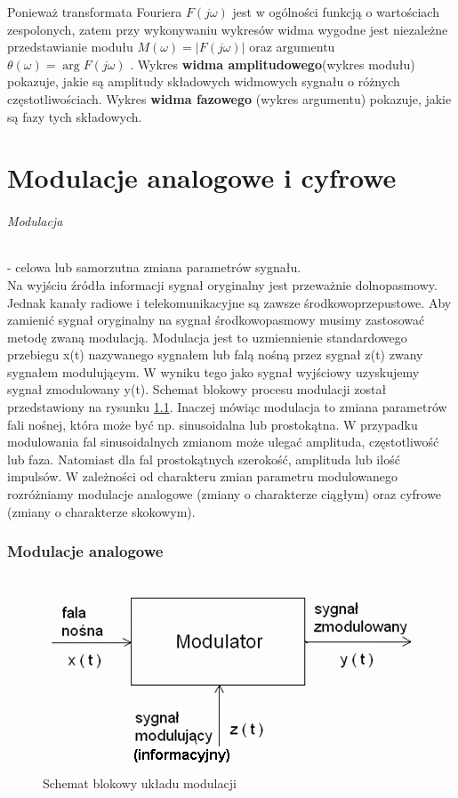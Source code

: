 \documentclass[a4paper,twoside]{report}
\begin{document}
Ponieważ transformata Fouriera  $ F(j \omega) $ jest w ogólności funkcją o wartościach zespolonych, zatem przy wykonywaniu wykresów widma wygodne jest niezależne przedstawianie modułu  $ M(\omega) = | F(j \omega) | $ oraz argumentu $ \theta(\omega) = \arg{F(j \omega)} $ . Wykres \textbf{widma amplitudowego}(wykres modułu) pokazuje, jakie są amplitudy składowych widmowych sygnału o różnych częstotliwościach. Wykres\textbf{ widma fazowego} (wykres argumentu) pokazuje, jakie są fazy tych składowych.

\chapter{Modulacje analogowe i cyfrowe}
\subparagraph{Modulacja} - celowa lub samorzutna zmiana parametrów sygnału. \\

Na wyjściu źródła informacji sygnał oryginalny jest przeważnie dolnopasmowy. Jednak kanały radiowe i telekomunikacyjne są zawsze środkowoprzepustowe. Aby zamienić sygnał oryginalny na sygnał środkowopasmowy musimy zastosować metodę zwaną modulacją. Modulacja jest to uzmiennienie standardowego przebiegu x(t) nazywanego sygnałem lub falą nośną przez sygnał z(t) zwany sygnałem modulującym. W wyniku tego jako sygnał wyjściowy uzyskujemy sygnał zmodulowany y(t). Schemat blokowy procesu modulacji został przedstawiony na rysunku \ref{rys:modulacja_blok}. Inaczej mówiąc modulacja to zmiana parametrów fali nośnej, która może być np. sinusoidalna lub prostokątna. W przypadku modulowania fal sinusoidalnych zmianom może ulegać amplituda, częstotliwość lub faza. Natomiast dla fal prostokątnych szerokość, amplituda lub ilość impulsów. W zależności od charakteru zmian parametru modulowanego rozróżniamy modulacje analogowe (zmiany o charakterze ciągłym) oraz cyfrowe (zmiany o charakterze skokowym).
\subsection{Modulacje analogowe}

\begin{figure}[htbp]
\centering
\includegraphics[scale=0.7]{obrazy/modulacja_blok.png}
\caption{Schemat blokowy układu modulacji}
\label{rys:modulacja_blok}
\end{figure}
\end{document}
